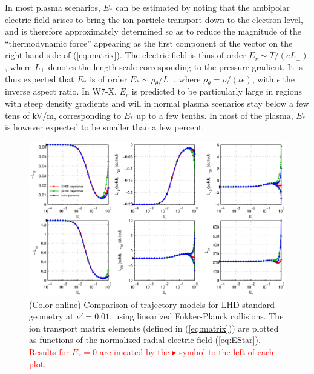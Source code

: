 \documentclass[12pt,superscriptaddress]{revtex4}
\newcommand{\changed}[1]{\textcolor{red}{#1}}
\begin{document}
In most plasma scenarios, $E_*$ can be estimated by noting that the
ambipolar electric field arises to bring the ion particle transport
down to the electron level, and is therefore approximately determined so 
as to reduce the magnitude of the ``thermodynamic
force'' appearing as the first component of the vector on the
right-hand side of (\ref{eq:matrix}). The electric field is thus of
order $E_r \sim T/(eL_\perp)$, where $L_\perp$ denotes the length
scale corresponding to the pressure gradient. It is thus expected that $E_*$
is of order $E_* \sim \rho_\theta / L_\perp$, where $\rho_{\theta} =
\rho / (\iota \epsilon)$, with $\epsilon$ the inverse aspect ratio. In
W7-X, $E_r$ is predicted to be particularly large in regions with
steep density gradients and will in normal plasma scenarios stay below
a few tens of kV/m, corresponding to $E_*$ up to a few tenths\cite{Turkin}.
In most of the plasma, $E_*$ is however expected to be smaller than a few percent.




\begin{figure}[h!]
\includegraphics{m20140205_03_plotSFINCSFortranErComparisonForPaper_LHD.eps}
\caption{(Color online) Comparison of trajectory models for LHD standard geometry at $\nu' = 0.01$,
using linearized Fokker-Planck collisions.
The ion transport matrix elements (defined in (\ref{eq:matrix})) are plotted as functions
of the normalized radial electric field (\ref{eq:EStar}).
\changed{Results for $E_r=0$ are inicated by the $\blacktriangleright$ symbol to the left of each plot.}
\label{fig:ErComparison_LHD}}
\end{figure}
\end{document}
